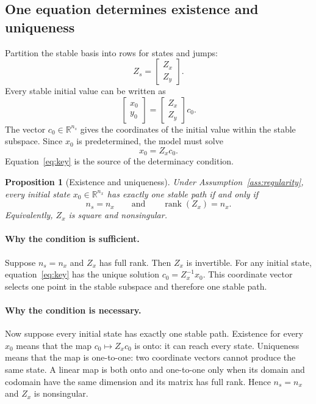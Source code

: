 \documentclass[11pt]{article}
\newtheorem{proposition}{Proposition}
\begin{document}
\subsection{One equation determines existence and uniqueness}

Partition the stable basis into rows for states and jumps:
\begin{equation}
    Z_s=\begin{bmatrix}Z_x\\Z_y\end{bmatrix}.
    \label{eq:partition}
\end{equation}
Every stable initial value can be written as
\[
    \begin{bmatrix}x_0\\y_0\end{bmatrix}
    =
    \begin{bmatrix}Z_x\\Z_y\end{bmatrix}c_0.
\]
The vector $c_0\in\mathbb{R}^{n_s}$ gives the coordinates of the initial value
within the stable subspace. Since $x_0$ is predetermined, the model must solve
\begin{equation}
    x_0=Z_xc_0.
    \label{eq:key}
\end{equation}
Equation~\eqref{eq:key} is the source of the determinacy condition.

\begin{proposition}[Existence and uniqueness]\label{prop:determinacy}
Under Assumption~\ref{ass:regularity}, every initial state
$x_0\in\mathbb{R}^{n_x}$ has exactly one stable path if and only if
\[
    n_s=n_x
    \qquad\text{and}\qquad
    \operatorname{rank}(Z_x)=n_x.
\]
Equivalently, $Z_x$ is square and nonsingular.
\end{proposition}

\paragraph{Why the condition is sufficient.}
Suppose $n_s=n_x$ and $Z_x$ has full rank. Then $Z_x$ is invertible. For any
initial state, equation~\eqref{eq:key} has the unique solution
$c_0=Z_x^{-1}x_0$. This coordinate vector selects one point in the stable
subspace and therefore one stable path.

\paragraph{Why the condition is necessary.}
Now suppose every initial state has exactly one stable path. Existence for
every $x_0$ means that the map $c_0\mapsto Z_xc_0$ is onto: it can reach every
state. Uniqueness means that the map is one-to-one: two coordinate vectors
cannot produce the same state. A linear map is both onto and one-to-one only
when its domain and codomain have the same dimension and its matrix has full
rank. Hence $n_s=n_x$ and $Z_x$ is nonsingular.
\end{document}
